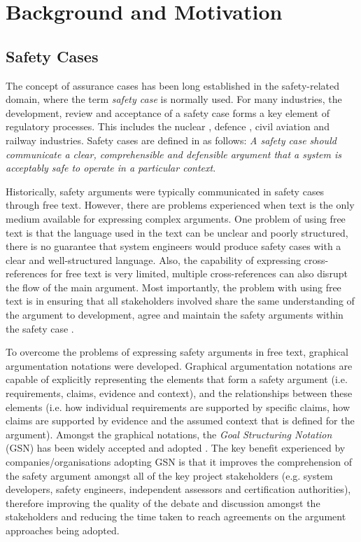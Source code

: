 \section{Background and Motivation}
\label{sec:background}

\subsection{Safety Cases}
The concept of assurance cases has been long established in the safety-related domain, where the term \textit{safety case} is normally used. 
For many industries, the development, review and acceptance of a safety case forms a key element of regulatory processes. This includes the nuclear \cite{hse}, defence \cite{mod2007}, civil aviation \cite{caa2007} and railway \cite{yellowBook2007} industries. 
Safety cases are defined in \cite{kelly2004goal} as follows: \textit{A safety case should communicate a clear, comprehensible and defensible argument that a system is acceptably safe to operate in a particular context}. 

Historically, safety arguments were typically communicated in safety cases through free text. However, there are problems experienced when text is the only medium available for expressing complex arguments. 
One problem of using free text is that the language used in the text can be unclear and poorly structured, there is no guarantee that system engineers would produce safety cases with a clear and well-structured language. 
Also, the capability of expressing cross-references for free text is very limited, multiple cross-references can also disrupt the flow of the main argument. 
Most importantly, the problem with using free text is in ensuring that all stakeholders involved share the same understanding of the argument to development, agree and maintain the safety arguments within the safety case \cite{kelly2004goal}.

To overcome the problems of expressing safety arguments in free text, graphical argumentation notations were developed. 
Graphical argumentation notations are capable of explicitly representing the elements that form a safety argument (i.e. requirements, claims, evidence and context), and the relationships between these elements (i.e. how individual requirements are supported by specific claims, how claims are supported by evidence and the assumed context that is defined for the argument). 
Amongst the graphical notations, the \textit{Goal Structuring Notation} (GSN) \cite{kelly2004goal} has been widely accepted and adopted \cite{chinneck2004turning}. 
The key benefit experienced by companies/organisations adopting GSN is that it improves the comprehension of the safety argument amongst all of the key project stakeholders (e.g. system developers, safety engineers, independent assessors and certification authorities), therefore improving the quality of the debate and discussion amongst the stakeholders and reducing the time taken to reach agreements on the argument approaches being adopted.

